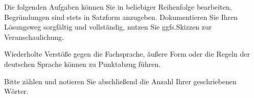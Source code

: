 {\footnotesize Die folgenden Aufgaben können Sie in beliebiger Reihenfolge bearbeiten. Begründungen sind stets in Satzform anzugeben. Dokumentieren Sie Ihren Lösungsweg sorgfältig und vollständig, nutzen Sie ggfs.\@ Skizzen zur Veranschaulichung. 

Wiederholte Verstöße gegen die Fachsprache, äußere Form oder die Regeln der deutschen Sprache können zu Punktabzug führen. 

Bitte zählen und notieren Sie abschließend die Anzahl Ihrer geschriebenen Wörter.}
